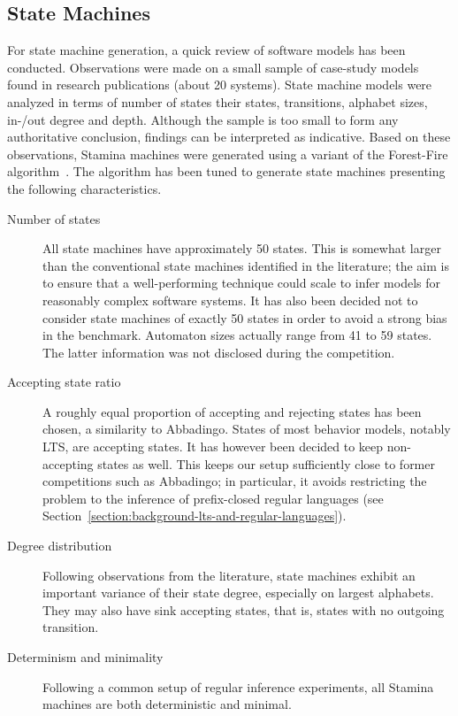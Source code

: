 \subsection{State Machines\label{subsection:stamina-machines}}

For state machine generation, a quick review of software models has been conducted. Observations were made on a small sample of case-study models found in research publications (about 20 systems). State machine models were analyzed in terms of number of states their states, transitions, alphabet sizes, in-/out degree and depth. Although the sample is too small to form any authoritative conclusion, findings can be interpreted as indicative. Based on these observations, Stamina machines were generated using a variant of the Forest-Fire algorithm~\cite{Leskovec2007}. The algorithm has been tuned to generate state machines presenting the following characteristics.
\begin{description}

\item[Number of states] All state machines have approximately 50 states. This is somewhat larger than the conventional state machines identified in the literature; the aim is to ensure that a well-performing technique could scale to infer models for reasonably complex software systems. It has also been decided not to consider state machines of exactly 50 states in order to avoid a strong bias in the benchmark. Automaton sizes actually range from 41 to 59 states. The latter information was not disclosed during the competition.

\item[Accepting state ratio] A roughly equal proportion of accepting and rejecting states has been chosen, a similarity to Abbadingo. States of most behavior models, notably LTS, are accepting states. It has however been decided to keep non-accepting states as well. This keeps our setup sufficiently close to former competitions such as Abbadingo; in particular, it avoids restricting the problem to the inference of prefix-closed regular languages (see Section~\ref{section:background-lts-and-regular-languages}).

\item[Degree distribution] Following observations from the literature, state machines exhibit an important variance of their state degree, especially on largest alphabets. They may also have sink accepting states, that is, states with no outgoing transition.

\item[Determinism and minimality] Following a common setup of regular inference experiments, all Stamina machines are both deterministic and minimal.

\end{description}

